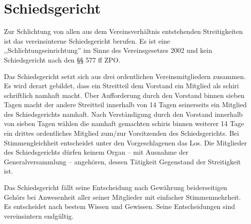 \documentclass{article}
\begin{document}
\section{Schiedsgericht}\label{schiedsgericht}
\begin{absatz}
    \item Zur Schlichtung von allen aus dem Vereinsverhältnis entstehenden Streitigkeiten ist das vereinsinterne Schiedsgericht berufen. Es ist eine ,,Schlichtungseinrichtung'' im Sinne des Vereinsgesetzes 2002 und kein Schiedsgericht nach den §§ 577 ff ZPO.
    \item Das Schiedsgericht setzt sich aus drei ordentlichen Vereinsmitgliedern zusammen. Es wird derart gebildet, dass ein Streitteil dem Vorstand ein Mitglied als \gls{schiri} schriftlich namhaft macht. Über Aufforderung durch den Vorstand binnen sieben Tagen macht der andere Streitteil innerhalb von 14 Tagen seinerseits ein Mitglied des Schiedsgerichts namhaft. Nach Verständigung durch den Vorstand innerhalb von sieben Tagen wählen die namhaft gemachten \glspl{schiri} binnen weiterer 14 Tage ein drittes ordentliches Mitglied zum/zur Vorsitzenden des Schiedsgerichts. Bei Stimmengleichheit entscheidet unter den Vorgeschlagenen das Los. Die Mitglieder des Schiedsgerichts dürfen keinem Organ – mit Ausnahme der Generalversammlung – angehören, dessen Tätigkeit Gegenstand der Streitigkeit ist.
    \item Das Schiedsgericht fällt seine Entscheidung nach Gewährung beiderseitigen Gehörs bei Anwesenheit aller seiner Mitglieder mit einfacher Stimmenmehrheit. Es entscheidet nach bestem Wissen und Gewissen. Seine Entscheidungen sind vereinsintern endgültig.
\end{absatz}
\end{document}
